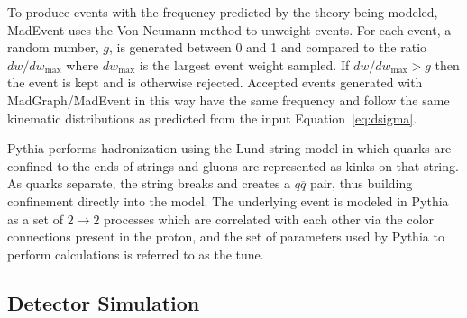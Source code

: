  To produce events with the frequency
  predicted by the theory being modeled,
  MadEvent uses the Von Neumann method to unweight events.
 For each event, a random number, $g$, is generated 
  between 0 and 1 and compared to the ratio
  $dw/dw_{\mathrm{max}}$ where $dw_{\mathrm{max}}$
  is the largest event weight sampled.
 If $dw/dw_{\mathrm{max}}>g$ then the event is kept
  and is otherwise rejected.
 Accepted events generated with MadGraph/MadEvent in this 
  way have the same frequency and follow the same
  kinematic distributions as predicted
  from the input Equation~\ref{eq:dsigma}.

 Pythia performs hadronization using the
  Lund string model in which quarks are
  confined to the ends of strings and
  gluons are represented as kinks on that string.
 As quarks separate, the string breaks and
  creates a $q\overline{q}$ pair, 
  thus building confinement directly into the model.
 The underlying event is modeled in Pythia
  as a set of $2\rightarrow 2$ processes
  which are correlated with each other via the
  color connections present in the proton, 
  and the set of parameters used by Pythia
  to perform calculations is referred to as 
  the tune.
 

\subsection{Detector Simulation}

